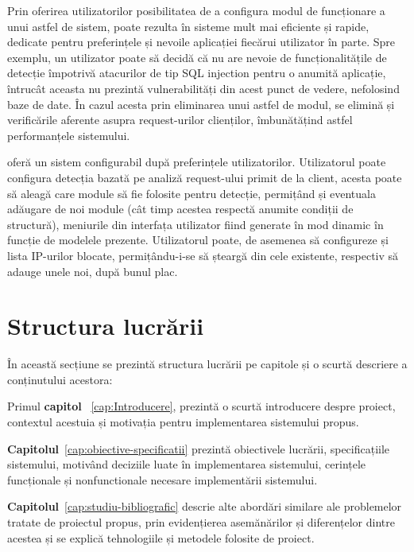 Prin oferirea utilizatorilor posibilitatea de a configura modul de funcționare a unui astfel de sistem, poate rezulta în sisteme mult mai eficiente și rapide, dedicate pentru preferințele și nevoile aplicației fiecărui utilizator în parte. Spre exemplu, un utilizator poate să decidă că nu are nevoie de funcționalitățile de detecție împotrivă atacurilor de tip SQL injection pentru o anumită aplicație, întrucât aceasta nu prezintă vulnerabilități din acest punct de vedere, nefolosind baze de date. În cazul acesta prin eliminarea unui astfel de modul, se elimină și verificările aferente asupra request-urilor clienților, îmbunătățind astfel performanțele sistemului. 

\textit{\thesistitle}  oferă un sistem configurabil după preferințele utilizatorilor. Utilizatorul poate configura detecția bazată pe analiză request-ului primit de la client, acesta poate să aleagă care module să fie folosite pentru detecție, permițând și eventuala adăugare de noi module (cât timp acestea respectă anumite condiții de structură), meniurile din interfața utilizator fiind generate în mod dinamic în funcție de modelele prezente. Utilizatorul poate, de asemenea să configureze și lista IP-urilor blocate, permițându-i-se să șteargă din cele existente, respectiv să adauge unele noi, după bunul plac. 


 \section{Structura lucrării}
În această secțiune se prezintă structura lucrării pe capitole și o scurtă descriere a conținutului acestora: 

Primul \textbf{capitol} ~\ref{cap:Introducere},  prezintă o scurtă introducere despre proiect, contextul acestuia și motivația pentru implementarea sistemului propus. 

\textbf{Capitolul}~\ref{cap:obiective-specificatii}  prezintă obiectivele lucrării, specificațiile sistemului, motivând deciziile luate în implementarea sistemului, cerințele funcționale și nonfunctionale necesare implementării sistemului. 

\textbf{Capitolul}~\ref{cap:studiu-bibliografic}  descrie alte abordări similare ale problemelor tratate de proiectul propus, prin evidențierea asemănărilor și diferențelor dintre acestea și se explică tehnologiile și metodele folosite de proiect. 
 
